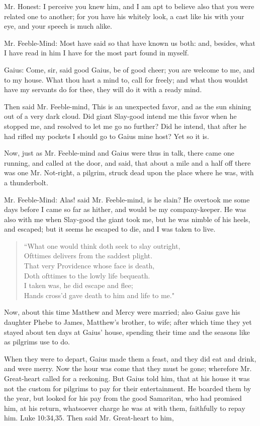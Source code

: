 Mr. Honest: I perceive you knew him, and I am apt to believe also that you were related one to another; for you have his whitely look, a cast like his with your eye, and your speech is much alike.

Mr. Feeble-Mind: Most have said so that have known us both: and, besides, what I have read in him I have for the most part found in myself.

Gaius: Come, sir, said good Gaius, be of good cheer; you are welcome to me, and to my house. What thou hast a mind to, call for freely; and what thou wouldst have my servants do for thee, they will do it with a ready mind.

Then said Mr. Feeble-mind, This is an unexpected favor, and as the sun shining out of a very dark cloud. Did giant Slay-good intend me this favor when he stopped me, and resolved to let me go no further? Did he intend, that after he had rifled my pockets I should go to Gaius mine host? Yet so it is.

Now, just as Mr. Feeble-mind and Gaius were thus in talk, there came one running, and called at the door, and said, that about a mile and a half off there was one Mr. Not-right, a pilgrim, struck dead upon the place where he was, with a thunderbolt.

Mr. Feeble-Mind: Alas! said Mr. Feeble-mind, is he slain? He overtook me some days before I came so far as hither, and would be my company-keeper. He was also with me when Slay-good the giant took me, but he was nimble of his heels, and escaped; but it seems he escaped to die, and I was taken to live.
\begin{verse}
``What one would think doth seek to slay outright,\\
Ofttimes delivers from the saddest plight.\\
That very Providence whose face is death,\\
Doth ofttimes to the lowly life bequeath.\\
I taken was, he did escape and flee;\\
Hands cross'd gave death to him and life to me."\\
\end{verse}

Now, about this time Matthew and Mercy were married; also Gaius gave his daughter Phebe to James, Matthew's brother, to wife; after which time they yet stayed about ten days at Gaius' house, spending their time and the seasons like as pilgrims use to do.

When they were to depart, Gaius made them a feast, and they did eat and drink, and were merry. Now the hour was come that they must be gone; wherefore Mr. Great-heart called for a reckoning. But Gaius told him, that at his house it was not the custom for pilgrims to pay for their entertainment. He boarded them by the year, but looked for his pay from the good Samaritan, who had promised him, at his return, whatsoever charge he was at with them, faithfully to repay him. Luke 10:34,35. Then said Mr. Great-heart to him,

